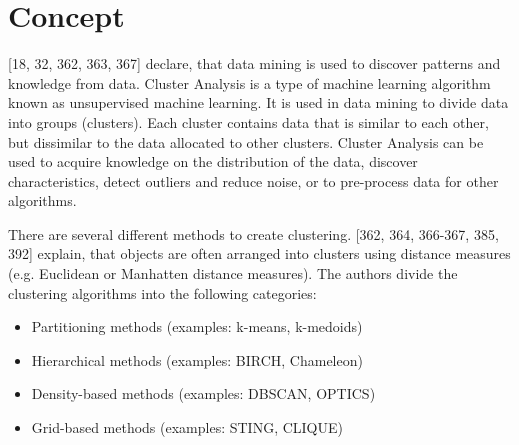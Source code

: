 \documentclass[12pt,a4paper]{article}
\title{\titlename}
\author{ \authorid\\ \scriptsize \address }
\date{\exposedate}
\begin{document}

\maketitle

\section*{Concept}

\textcite{han2011data}[18, 32, 362, 363, 367] declare, that data mining is used to discover patterns and knowledge from data.
Cluster Analysis is a type of machine learning algorithm known as unsupervised machine learning. It is used in data mining to divide data into groups (clusters). Each cluster contains data that is similar to each other, but dissimilar to the data allocated to other clusters. Cluster Analysis can be used to acquire knowledge on the distribution of the data, discover characteristics, detect outliers and reduce noise, or to pre-process data for other algorithms. 


There are several different methods to create clustering. \textcite{han2011data}[362, 364, 366-367, 385, 392] explain, that objects are often arranged into clusters using distance measures (e.g. Euclidean or Manhatten distance measures). The authors divide the clustering algorithms into the following categories:
\begin{itemize}
	\item Partitioning methods (examples: k-means, k-medoids)
	\item Hierarchical methods (examples: BIRCH, Chameleon)
	\item Density-based methods (examples: DBSCAN, OPTICS)
	\item Grid-based methods (examples: STING, CLIQUE)
\end{itemize}
\end{document}
